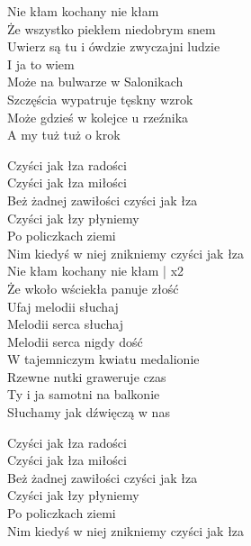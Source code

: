 \begin{text}
    \chordfill
    Nie kłam kochany nie kłam\\
    Że wszystko piekłem niedobrym snem\\
    Uwierz są tu i ówdzie zwyczajni ludzie\\
    I ja to wiem\\
    Może na bulwarze w Salonikach\\
    Szczęścia wypatruje tęskny wzrok\\
    Może gdzieś w kolejce u rzeźnika\\
    A my tuż tuż o krok

    \vin Czyści jak łza radości\\
    \vin Czyści jak łza miłości\\
    \vin Beż żadnej zawiłości czyści jak łza\\
    \vin Czyści jak łzy płyniemy\\
    \vin Po policzkach ziemi\\
    \vin Nim kiedyś w niej znikniemy czyści jak łza\\

    Nie kłam kochany nie kłam | x2\\
    Że wkoło wściekła panuje złość\\
    Ufaj melodii słuchaj\\
    Melodii serca słuchaj\\
    Melodii serca nigdy dość\\
    W tajemniczym kwiatu medalionie\\
    Rzewne nutki graweruje czas\\
    Ty i ja samotni na balkonie\\
    Słuchamy jak dźwięczą w nas

    \vin Czyści jak łza radości\\
    \vin Czyści jak łza miłości\\
    \vin Beż żadnej zawiłości czyści jak łza\\
    \vin Czyści jak łzy płyniemy\\
    \vin Po policzkach ziemi\\
    \vin Nim kiedyś w niej znikniemy czyści jak łza

\end{text}
